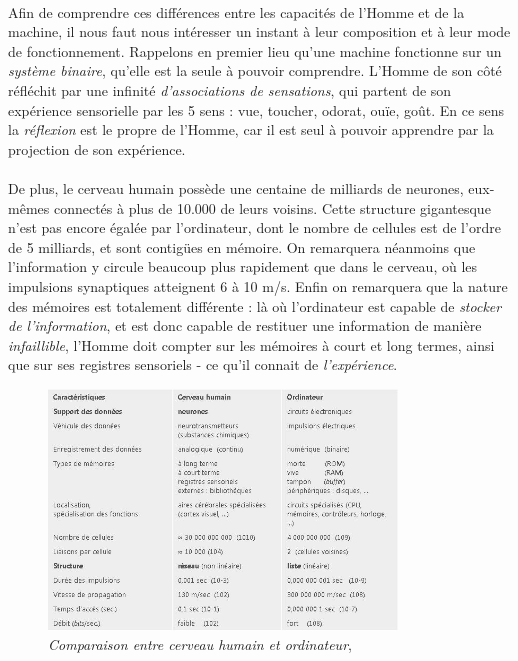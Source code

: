 \paragraph{} Afin de comprendre ces différences entre les capacités de l'Homme et de la machine, il nous faut nous
intéresser un instant à leur composition et à leur mode de fonctionnement. Rappelons en premier lieu qu'une machine
fonctionne sur un \emph{système binaire}, qu'elle est la seule à pouvoir comprendre. L'Homme de son côté réfléchit
par une infinité \emph{d'associations de sensations}, qui partent de son expérience sensorielle par les 5 sens : vue,
toucher, odorat, ouïe, goût. En ce sens la \emph{réflexion} est le propre de l'Homme, car il est seul à pouvoir 
apprendre par la projection de son expérience. \cite{Brain1}

\paragraph{} De plus, le cerveau humain possède une centaine de milliards de neurones, eux-mêmes connectés à plus de 10.000
de leurs voisins. Cette structure gigantesque n'est pas encore égalée par l'ordinateur, dont le nombre de cellules est de
l'ordre de 5 milliards, et sont contigües en mémoire. On remarquera néanmoins que l'information y circule
beaucoup plus rapidement que dans le cerveau, où les impulsions synaptiques atteignent 6 à 10 m/s. Enfin on remarquera que la
nature des mémoires est totalement différente : là où l'ordinateur est capable de \emph{stocker de l'information}, et est donc
capable de restituer une information de manière \emph{infaillible}, l'Homme doit compter sur les mémoires à court et long termes,
ainsi que sur ses registres sensoriels - ce qu'il connait de \emph{l'expérience}. \cite{Brain0}

\begin{figure}[h]
    \centering
    \includegraphics[width=350px]{chapters/03/images/cerveau-robot.jpg}
    \caption{\label{comparatif} \emph{Comparaison entre cerveau humain et ordinateur}, \cite{Brain1}}
\end{figure}

